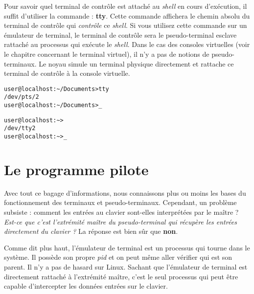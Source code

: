 \begin{tcolorbox}[title=Comment savoir quel est mon terminal de contrôle?]
Pour savoir quel terminal de contrôle est attaché au \textit{shell} en cours d'exécution, il suffit d'utiliser la commande : \textbf{tty}. Cette commande affichera le chemin absolu du terminal de contrôle qui \textit{contrôle} ce \textit{shell}. Si vous utilisez cette commande sur un émulateur de terminal, le terminal de contrôle sera le pseudo-terminal esclave rattaché au processus qui exécute le \textit{shell}. Dans le cas des consoles virtuelles (voir le chapitre concernant le terminal virtuel), il n'y a pas de notions de pseudo-terminaux. Le noyau simule un terminal physique directement et rattache ce terminal de contrôle à la console virtuelle.
\end{tcolorbox}

\begin{tcolorbox}[title=Utilisation de la commande sur l'émulateur de terminal]
\begin{verbatim}
user@localhost:~/Documents>tty
/dev/pts/2
user@localhost:~/Documents>_
\end{verbatim}
\end{tcolorbox}

\begin{tcolorbox}[title=Utilisation de la commande sur la console virtuelle]
\begin{verbatim}
user@localhost:~>
/dev/tty2
user@localhost:~>_
\end{verbatim}
\end{tcolorbox}

\section{Le programme pilote}
Avec tout ce bagage d'informations, nous connaissons plus ou moins les bases du fonctionnement des terminaux et pseudo-terminaux. Cependant, un problème subsiste : comment les entrées au clavier sont-elles interprétées par le maître ? \textit{Est-ce que c'est l'extrémité maître du pseudo-terminal qui récupère les entrées directement du clavier ?} La réponse est bien sûr que \textbf{non}.

Comme dit plus haut, l'émulateur de terminal est un processus qui tourne dans le système. Il possède son propre \textit{pid} et on peut même aller vérifier qui est son parent. Il n'y a pas de hasard sur Linux. Sachant que l'émulateur de terminal est directement rattaché à l'extrémité maître, c'est le seul processus qui peut être capable d'intercepter les données entrées sur le clavier.

